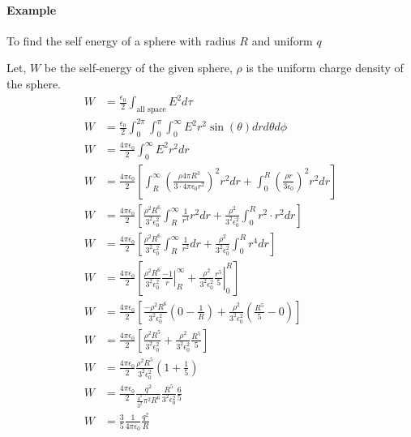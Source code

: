 \documentclass{article}
\begin{document}
\paragraph{Example} To find the self energy of a sphere with radius $R$ and uniform $q$\\
\begin{center}
\end{center}
Let, $W$ be the self-energy of the given sphere, $\rho$ is the uniform charge density of the sphere.\\
\begin{align*}
    W &= \frac{\epsilon_0}{2} \int_{\text{all space}} E^2 d\tau\\
    W &= \frac{\epsilon_0}{2} \int_{0}^{2\pi}\int_{0}^{\pi} \int_{0}^{\infty} E^2 r^2 \sin(\theta) dr d\theta d\phi\\
    W &= \frac{4 \pi \epsilon_0}{2} \int_{0}^{\infty} E^2 r^2 dr \\
    W &= \frac{4 \pi \epsilon_0}{2} \left[ \int_{R}^{\infty} \left( \frac{\rho 4 \pi R^3}{3\cdot 4 \pi \epsilon_0 r^2}\right)^2 r^2 dr + \int_{0}^{R} \left( \frac{\rho r}{3 \epsilon_0}\right)^2 r^2 dr \right]\\
    W &= \frac{4 \pi \epsilon_0}{2} \left[ \frac{\rho ^2 R^6}{3^2 \epsilon_0^2} \int_{R}^{\infty}  \frac{1}{r^4} r^2 dr + \frac{\rho^2}{3^2 \epsilon_0^2} \int_{0}^{R} r^2\cdot r^2 dr \right]\\
    W &= \frac{4 \pi \epsilon_0}{2} \left[ \frac{\rho ^2 R^6}{3^2 \epsilon_0^2} \int_{R}^{\infty}  \frac{1}{r^2} dr + \frac{\rho^2}{3^2 \epsilon_0^2} \int_{0}^{R} r^4 dr \right]\\
    W &= \frac{4 \pi \epsilon_0}{2} \left[ \frac{\rho ^2 R^6}{3^2 \epsilon_0^2} \left. \frac{-1}{r} \right|_R^{\infty}+ \left. \frac{\rho^2}{3^2 \epsilon_0^2} \frac{r^5}{5} \right|_0^R  \right]\\
    W &= \frac{4 \pi \epsilon_0}{2} \left[\frac{-\rho ^2 R^6}{3^2 \epsilon_0^2} (0 - \frac{1}{R}) + \frac{\rho^2}{3^2 \epsilon_0^2} \left( \frac{R^5}{5} -0\right)  \right]\\
    W &= \frac{4 \pi \epsilon_0}{2} \left[ \frac{\rho ^2 R^5}{3^2 \epsilon_0^2} + \frac{\rho^2}{3^2 \epsilon_0^2} \frac{R^5}{5}\right]\\
    W &= \frac{4 \pi \epsilon_0}{2} \frac{\rho^2 R^5}{3^2 \epsilon_0^2} \left(1 + \frac{1}{5}\right) \\
    W &= \frac{4 \pi \epsilon_0}{2} \frac{q^2}{\frac{4^2}{3^2} \pi^2 R^6} \frac{R^5}{3^2 \epsilon_0^2} \frac{6}{5}\\
    W &= \frac{3}{5} \frac{1}{4 \pi \epsilon_0} \frac{q^2}{R}
\end{align*}
\end{document}
